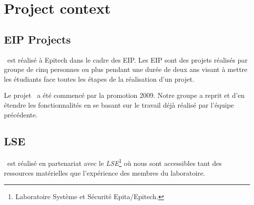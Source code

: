 \documentclass[francais]{rtxarticle}
\begin{document}
\section*{Project context}

\subsection*{EIP Projects}

\rtx\ est réalisé à Epitech dans le cadre des EIP. Les EIP sont des projets
réalisés par groupe de cinq personnes ou plus pendant une durée de deux ans
visant à mettre les étudiants face toutes les étapes de la réalisation d'un
projet.

Le projet \rtx\ a été commencé par la promotion 2009. Notre groupe a reprit et
d'en étendre les fonctionnalités en se basant sur le travail déjà réalisé par
l'équipe précédente.

\subsection*{LSE}

\rtx\ est réalisé en partenariat avec le \emph{LSE}\footnote{Laboratoire
Système et Sécurité Epita/Epitech.} où nous sont accessibles tant des
ressources matérielles que l'expérience des membres du laboratoire.

\rtxmaketitleblock
\end{document}
